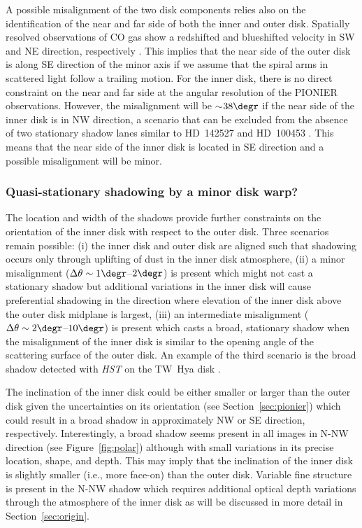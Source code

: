 \documentclass[twocolumn,tighten]{aastex61}
\begin{document}
A possible misalignment of the two disk components relies also on the identification of the near and far side of both the inner and outer disk. Spatially resolved observations of CO gas show a redshifted and blueshifted velocity in SW and NE direction, respectively \citep[e.g.,][]{perez2014}. This implies that the near side of the outer disk is along SE direction of the minor axis if we assume that the spiral arms in scattered light follow a trailing motion. For the inner disk, there is no direct constraint on the near and far side at the angular resolution of the \mbox{PIONIER} observations. However, the misalignment will be $\sim$$38\degr$ if the near side of the inner disk is in NW direction, a scenario that can be excluded from the absence of two stationary shadow lanes similar to HD~142527 \citep[$\Delta\theta=70\degr$;][]{marino2015} and HD~100453 \citep[$\Delta\theta=72\degr$;][]{benisty2017}. This means that the near side of the inner disk is located in SE direction and a possible misalignment will be minor.

\subsubsection{Quasi-stationary shadowing by a minor disk warp?}\label{sec:warp}

The location and width of the shadows provide further constraints on the orientation of the inner disk with respect to the outer disk. Three scenarios remain possible: (i) the inner disk and outer disk are aligned such that shadowing occurs only through uplifting of dust in the inner disk atmosphere, (ii) a minor misalignment ($\Delta\theta\sim1\degr$--$2\degr$) is present which might not cast a stationary shadow but additional variations in the inner disk will cause preferential shadowing in the direction where elevation of the inner disk above the outer disk midplane is largest, (iii) an intermediate misalignment ($\Delta\theta\sim2\degr$--$10\degr$) is present which casts a broad, stationary shadow when the misalignment of the inner disk is similar to the opening angle of the scattering surface of the outer disk. An example of the third scenario is the broad shadow detected with \emph{HST} on the TW~Hya disk \citep[$\Delta\theta=8\degr$;][]{rosenfeld2012}.

The inclination of the inner disk could be either smaller or larger than the outer disk given the uncertainties on its orientation (see Section~\ref{sec:pionier}) which could result in a broad shadow in approximately NW or SE direction, respectively. Interestingly, a broad shadow seems present in all images in N-NW direction (see Figure~\ref{fig:polar}) although with small variations in its precise location, shape, and depth. This may imply that the inclination of the inner disk is slightly smaller (i.e., more face-on) than the outer disk. Variable fine structure is present in the N-NW shadow which requires additional optical depth variations through the atmosphere of the inner disk as will be discussed in more detail in Section~\ref{sec:origin}.
\end{document}
